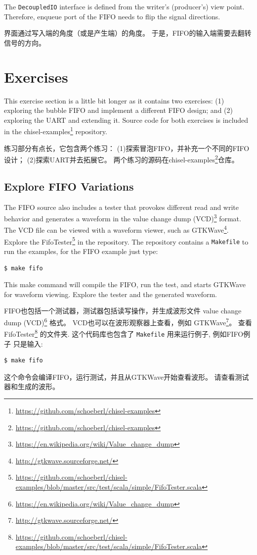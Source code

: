 \documentclass[%
    10pt,
    headinclude, footexclude,
    openright, %
    notitlepage,
    cleardoubleempty,
    headsepline,
    pointlessnumbers,
    bibtotoc, idxtotoc,
    ]{scrbook}
\newcommand{\code}[1]{{\small{\texttt{#1}}}}
\newcommand{\myref}[2]{\href{#1}{#2}}
\renewcommand{\myref}[2]{{#2}{\footnote{\url{#1}}}}
\begin{document}

\noindent The \code{DecoupledIO} interface is defined from the writer's (producer's) view point.
Therefore, enqueue port of the FIFO needs to flip the signal directions.

\noindent \code{DecoupledIO}界面通过写入端的角度（或是产生端）的角度。
于是，FIFO的输入端需要去翻转信号的方向。

\section{Exercises}

This exercise section is a little bit longer as it contains two exercises:
(1) exploring the bubble FIFO and implement a different FIFO design;
and (2) exploring the UART and extending it.
Source code for both exercises is included in the
\myref{https://github.com/schoeberl/chisel-examples}{chisel-examples} repository.

练习部分有点长，它包含两个练习：
(1)探索冒泡FIFO，并补充一个不同的FIFO设计；
(2)探索UART并去拓展它。
两个练习的源码在\myref{https://github.com/schoeberl/chisel-examples}{chisel-examples}仓库。

\subsection{Explore FIFO Variations}

The FIFO source also includes a tester that provokes different read and write behavior and generates a waveform in the 
\myref{https://en.wikipedia.org/wiki/Value_change_dump}{value change dump (VCD)} format.
The VCD file can be viewed with a waveform viewer, such as
\myref{http://gtkwave.sourceforge.net/}{GTKWave}.
Explore the
\myref{https://github.com/schoeberl/chisel-examples/blob/master/src/test/scala/simple/FifoTester.scala}{FifoTester} in the repository.
The repository contains a \code{Makefile} to run the examples, for the FIFO example
just type:
\begin{verbatim}
$ make fifo
\end{verbatim}
This make command will compile the FIFO, run the test, and starts GTKWave for waveform
viewing. Explore the tester and the generated waveform.

FIFO也包括一个测试器，测试器包括读写操作，并生成波形文件
\myref{https://en.wikipedia.org/wiki/Value_change_dump}{value change dump (VCD)} 格式。
VCD也可以在波形观察器上查看，例如
\myref{http://gtkwave.sourceforge.net/}{GTKWave}。
查看
\myref{https://github.com/schoeberl/chisel-examples/blob/master/src/test/scala/simple/FifoTester.scala}{FifoTester} 的文件夹.
这个代码库也包含了 \code{Makefile} 用来运行例子, 例如FIFO例子
只是输入:
\begin{verbatim}
$ make fifo
\end{verbatim}
这个命令会编译FIFO，运行测试，并且从GTKWave开始查看波形。
请查看测试器和生成的波形。
\end{document}
